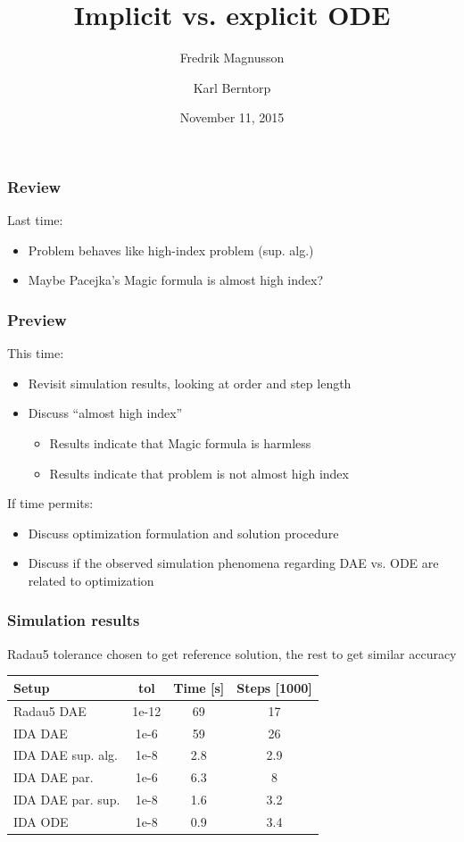 \documentclass[]{beamer}
\title{Implicit vs. explicit ODE}
\author{Fredrik Magnusson\inst{1} \and Karl Berntorp\inst{2}}
\institute
{
\inst{1} Department of Automatic Control \\
Lund University, Sweden \\
\vspace{14pt}
\inst{2} Mitsubishi Electric Research Laboratories \\
Cambridge, MA \\
\vspace{14pt}
\insertdate
}
\date{November 11, 2015}
\begin{document}
{
\begin{frame}[noframenumbering]
    \titlepage
\end{frame}
}

\begin{frame}
\frametitle{Review}
Last time:
\begin{itemize}
\item
Problem behaves like high-index problem (sup. alg.)
\item
Maybe Pacejka's Magic formula is almost high index?
\end{itemize}
\end{frame}

\begin{frame}
\frametitle{Preview}
This time:
\begin{itemize}
\item
Revisit simulation results, looking at order and step length
\item
Discuss ``almost high index''
\begin{itemize}
\item
Results indicate that Magic formula is harmless
\item
Results indicate that problem is not almost high index
\end{itemize}
\end{itemize}
If time permits:
\begin{itemize}
\item
Discuss optimization formulation and solution procedure
\item
Discuss if the observed simulation phenomena regarding DAE vs. ODE are related to optimization
\end{itemize}
\end{frame}

\begin{frame}
\frametitle{Simulation results}
Radau5 tolerance chosen to get reference solution, the rest to get similar accuracy

{\small
\begin{table}
\centering
\begin{tabular}{lccc}
\toprule
Setup & tol & Time [s] & Steps [1000] \\
\midrule
Radau5 DAE & 1e-12 & 69 & 17 \\
IDA DAE & 1e-6 & 59 & 26 \\
IDA DAE sup. alg. & 1e-8 & 2.8 & 2.9 \\
IDA DAE par. & 1e-6 & 6.3 & 8 \\
IDA DAE par. sup. & 1e-8 & 1.6 & 3.2 \\
IDA ODE & 1e-8 & 0.9 & 3.4 \\
\bottomrule
\end{tabular}
\end{table}
}
\end{frame}
\end{document}
